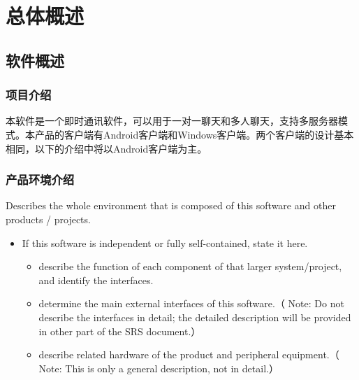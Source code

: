 \chapter{总体概述}
\iffalse
Describes the general elements that may affect the product and the requirements on the product. It includes the following four parts. Note that this section should not describe the specific requirements, instead, it makes the specific requirements to be described more understandable.

本节描述影响产品和产品需求的一般因素。由以下4个部分构成。 有一点需说明的是本节不描述具体的需求，只是使那些将要描述的具体需求更易于理解。
\fi
\section{软件概述}
\subsection{项目介绍}
\iffalse %
Describe the context and origin of the project being specified in this SRS. For example, state whether this project is a follow-on member of a project family, a replacement for certain existing systems, or a new, self-contained project.

描述本软件需求所描述的项目的背景。例如：本项目是一系列版本中的一个，或者是替代某个已经存在的系统，还是一个新的独立的项目。
\fi %
本软件是一个即时通讯软件，可以用于一对一聊天和多人聊天，支持多服务器模式。本产品的客户端有Android客户端和Windows客户端。两个客户端的设计基本相同，以下的介绍中将以Android客户端为主。
\subsection{产品环境介绍}
\iffalse  %
Describes the whole environment that is composed of this software and other products / projects.
\begin{itemize}
\item If this software is independent or fully self-contained, state it here.
\begin{itemize}
\item describe the function of each component of that larger system/project, and identify the interfaces.
\item determine the main external interfaces of this software.（ Note: Do not describe the interfaces in detail; the detailed description will be provided in other part of the SRS document.）
\item describe related hardware of the product and peripheral equipment.（ Note: This is only  a general description, not in detail.）
\end{itemize}
\end{itemize}


